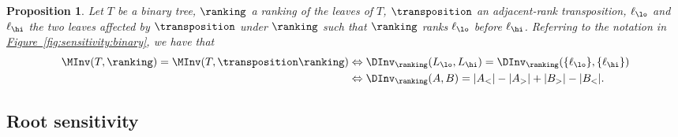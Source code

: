 \documentclass[11pt]{article}
\numberwithin{equation}{section}
\newtheorem{proposition}[theorem]{Proposition}
\theoremstyle{definition}
\theoremstyle{plain}
\newcommand{\expref}[2]{\hyperref[#2]{#1~\ref{#2}}}
\begin{document}
\begin{proposition}\label{prop:sensitivity:criterion}
Let $T$ be a binary tree, $\ranking$ a ranking of the leaves of $T$, $\transposition$ an adjacent-rank transposition, $\ell_\lo$ and $\ell_\hi$ the two leaves affected by $\transposition$ under $\ranking$ such that $\ranking$ ranks $\ell_\lo$ before $\ell_\hi$. Referring to the notation in \expref{Figure}{fig:sensitivity:binary}, we have that 
\begin{align}
\MInv(T,\ranking) = \MInv(T, \transposition \ranking)
&\Leftrightarrow \DInv_\ranking(L_\lo,L_\hi) = \DInv_\ranking(\{\ell_\lo\},\{\ell_\hi\}) \label{eq:criterion:binary:simple} \\
&\Leftrightarrow \DInv_\ranking(A,B) = |A_<| - |A_>| + |B_>| - |B_<|.
\label{eq:criterion:binary:simple:refined}
\end{align}
\end{proposition}

\subsection{Root sensitivity}
\label{sec:sensitivity:root}
\end{document}
